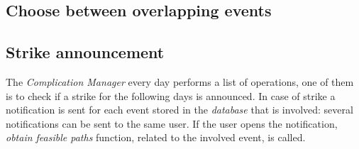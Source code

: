 \subsection{Choose between overlapping events}
		\noindent{}
\subsection{Strike announcement}
		\noindent{}
		The \textit{Complication Manager} every day performs a list of operations, one of them is to check if a strike for the following days is announced. 
		In case of strike a notification is sent for each event stored in the \textit{database} that is involved: several notifications can be sent to the same user. 
		If the user opens the notification, \textit{obtain feasible paths} function, related to the involved event, is called.